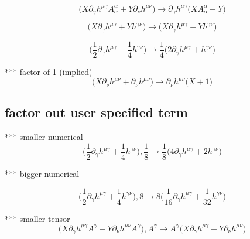 \documentclass{article}
\def\){\Big)}
\def\({\Big(}
\begin{document}
\begin{equation}
\(X \partial_{\gamma}h^{\mu \gamma} A^{\alpha}_{\alpha} + Y \partial_{\nu} h^{\mu \nu}\) \rightarrow
 \partial_{\gamma}h^{\mu \gamma} \(X A_{\alpha}^{\alpha} +Y \)
\end{equation}

\begin{equation}
\(X \partial_{\gamma}h^{\mu \gamma} + Y h^{\gamma \nu}\) \rightarrow
\(X \partial_{\gamma}h^{\mu \gamma} +Y h^{\gamma \nu} \)
\end{equation}

\begin{equation}
\(\frac{1}{2} \partial_{\gamma}h^{\mu \gamma} + \frac{1}{4}  h^{\gamma \nu}\) \rightarrow
\frac{1}{4} \(2 \partial_{\gamma}h^{\mu \gamma} + h^{\gamma \nu} \)
\end{equation}

*** factor of 1 (implied)
\begin{equation}
\(X \partial_{\nu}h^{\mu \nu} + \partial_{\nu} h^{\mu \nu}\) \rightarrow
\partial_{\nu}h^{\mu \nu} \(X +1 \)
\end{equation}


\subsection{factor out user specified term}

*** smaller numerical
\begin{equation}
\(\frac{1}{2} \partial_{\gamma}h^{\mu \gamma} + \frac{1}{4}  h^{\gamma \nu}\) , \frac{1}{8} \rightarrow
\frac{1}{8} \(4 \partial_{\gamma}h^{\mu \gamma} +2 h^{\gamma \nu} \)
\end{equation}

*** bigger numerical

\begin{equation}
\(\frac{1}{2} \partial_{\gamma}h^{\mu \gamma} + \frac{1}{4}  h^{\gamma \nu}\) , 8 \rightarrow
8 \(\frac{1}{16} \partial_{\gamma}h^{\mu \gamma} +\frac{1}{32} h^{\gamma \nu} \)
\end{equation}


*** smaller tensor\\

\begin{equation}
\(X \partial_{\gamma}h^{\mu \gamma} A^{\gamma} + Y \partial_{\nu} h^{\mu \nu}A^{\gamma}\) , A^{\gamma} \rightarrow
A^{\gamma} \(X \partial_{\gamma}h^{\mu \gamma} +Y \partial_{\nu}h^{\mu \nu} \)
\end{equation}
\end{document}
